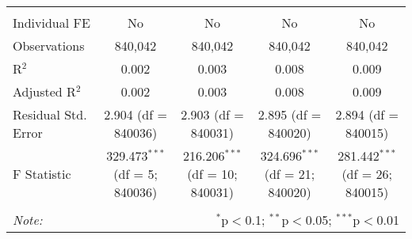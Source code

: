 \documentclass[
]{article}
\begin{document}
\begin{table}[!htbp]
{\begin{tabular}{@{\extracolsep{5pt}}lcccc}
  & & & & \\ 
\hline \\[-1.8ex] 
Individual FE & No & No & No & No \\ 
Observations & 840,042 & 840,042 & 840,042 & 840,042 \\ 
R$^{2}$ & 0.002 & 0.003 & 0.008 & 0.009 \\ 
Adjusted R$^{2}$ & 0.002 & 0.003 & 0.008 & 0.009 \\ 
Residual Std. Error & 2.904 (df = 840036) & 2.903 (df = 840031) & 2.895 (df = 840020) & 2.894 (df = 840015) \\ 
F Statistic & 329.473$^{***}$ (df = 5; 840036) & 216.206$^{***}$ (df = 10; 840031) & 324.696$^{***}$ (df = 21; 840020) & 281.442$^{***}$ (df = 26; 840015) \\ 
\hline 
\hline \\[-1.8ex] 
\textit{Note:}  & \multicolumn{4}{r}{$^{*}$p$<$0.1; $^{**}$p$<$0.05; $^{***}$p$<$0.01} \\ 
\end{tabular}
} 
\end{table} 
\newpage
\end{document}
